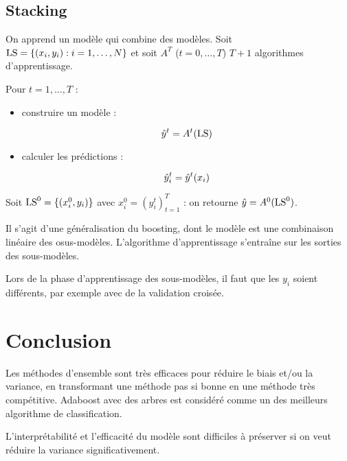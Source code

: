 	\subsection{Stacking}
	
	On apprend un modèle qui combine des modèles. Soit $\text{LS} = \lbrace (x_i, y_i) : i = 1, \dots , N \rbrace$ et soit $A^T$ ($t = 0, \dots , T$) $T + 1$ algorithmes d'apprentissage.
	
	Pour $t = 1, \dots , T$ :
	
	\begin{itemize}
		\item construire un modèle :
		
		$$\hat{y}^t = A^t(\text{LS})$$
		
		\item calculer les prédictions :
		
		$$\hat{y}_i^t = \hat{y}^t (x_i)$$
	\end{itemize}
	
	Soit $\text{LS}^0 = \lbrace (x_i^0, y_i) \rbrace$ avec $x_i^0 = (y_i^t)^T_{t = 1}$ : on retourne $\hat{y} = A^0(\text{LS}^0)$.
	
	Il s'agit d'une généralisation du boosting, dont le modèle est une combinaison linéaire des osus-modèles. L'algorithme d'apprentissage s'entraîne sur les sorties des sous-modèles.
	
	
	Lors de la phase d'apprentissage des sous-modèles, il faut que les $y_i$ soient différents, par exemple avec de la validation croisée.
	
	
\section{Conclusion}

Les méthodes d'ensemble sont très efficaces pour réduire le biais et/ou la variance, en transformant une méthode pas si bonne en une méthode très compétitive. Adaboost avec des arbres est considéré comme un des meilleurs algorithme de classification.

L'interprétabilité et l'efficacité du modèle sont difficiles à préserver si on veut réduire la variance significativement.